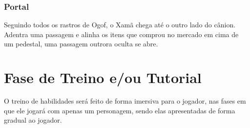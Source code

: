 \subsubsection{Portal}
Seguindo todos os rastros de Ogof, o Xamã chega até o outro lado do cânion. Adentra uma passagem e alinha os itens que comprou no mercado em cima de um pedestal, uma passagem outrora oculta se abre.

\section{Fase de Treino e/ou Tutorial}

O treino de habilidades será feito de forma imersiva para o jogador, nas fases em que ele jogará com apenas um personagem, sendo elas apresentadas de forma gradual ao jogador.
